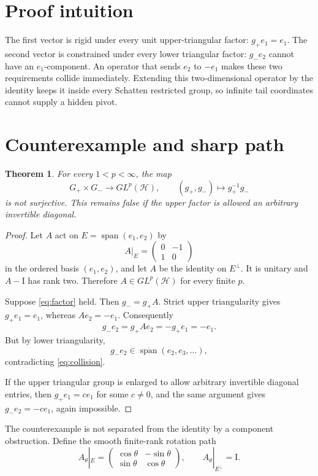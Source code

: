 \documentclass[11pt]{article}
\newtheorem{theorem}{Theorem}
\newcommand{\Hh}{\mathcal H}
\newcommand{\Id}{\mathrm I}
\newcommand{\clspan}{\overline{\operatorname{span}}}
\begin{document}
\section{Proof intuition}

The first vector is rigid under every unit upper-triangular factor:
\(g_+e_1=e_1\).  The second vector is constrained under every lower
triangular factor: \(g_-e_2\) cannot have an \(e_1\)-component.  An operator
that sends \(e_2\) to \(-e_1\) makes these two requirements collide
immediately.  Extending this two-dimensional operator by the identity keeps
it inside every Schatten restricted group, so infinite tail coordinates
cannot supply a hidden pivot.

\section{Counterexample and sharp path}

\begin{theorem}\label{thm:main}
For every \(1<p<\infty\), the map
\[
 G_+\times G_-\longrightarrow GL^p(\Hh),\qquad
 (g_+,g_-)\longmapsto g_+^{-1}g_-
\]
is not surjective.  This remains false if the upper factor is allowed an
arbitrary invertible diagonal.
\end{theorem}

\begin{proof}
Let \(A\) act on \(E=\operatorname{span}(e_1,e_2)\) by
\[
 A|_E=\begin{pmatrix}0&-1\\1&0\end{pmatrix}
\]
in the ordered basis \((e_1,e_2)\), and let \(A\) be the identity on
\(E^\perp\).  It is unitary and \(A-\Id\) has rank two.  Therefore
\(A\in GL^p(\Hh)\) for every finite \(p\).

Suppose \eqref{eq:factor} held.  Then \(g_-=g_+A\).  Strict upper
triangularity gives \(g_+e_1=e_1\), whereas \(Ae_2=-e_1\).  Consequently
\begin{equation}\label{eq:collision}
 g_-e_2=g_+Ae_2=-g_+e_1=-e_1.
\end{equation}
But by lower triangularity,
\[
 g_-e_2\in\clspan(e_2,e_3,\ldots),
\]
contradicting \eqref{eq:collision}.

If the upper triangular group is enlarged to allow arbitrary invertible
diagonal entries, then \(g_+e_1=c e_1\) for some \(c\neq0\), and the same
argument gives \(g_-e_2=-c e_1\), again impossible.
\end{proof}

The counterexample is not separated from the identity by a component
obstruction.  Define the smooth finite-rank rotation path
\begin{equation}\label{eq:path}
 A_\theta|_E=
 \begin{pmatrix}\cos\theta&-\sin\theta\\
 \sin\theta&\cos\theta\end{pmatrix},
 \qquad A_\theta|_{E^\perp}=\Id.
\end{equation}
\end{document}
